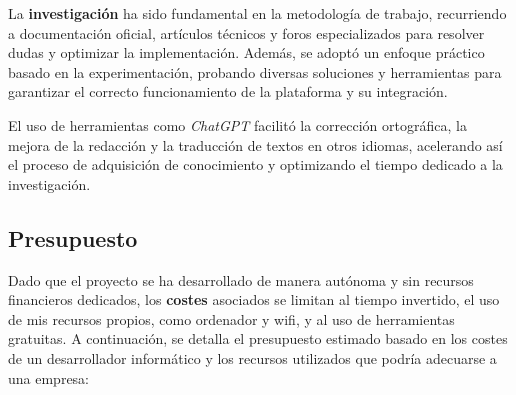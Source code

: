 La \textbf{investigación} ha sido fundamental en la metodología de trabajo, recurriendo a documentación oficial, artículos técnicos y foros especializados para resolver dudas y optimizar la implementación. Además, se adoptó un enfoque práctico basado en la experimentación, probando diversas soluciones y herramientas para garantizar el correcto funcionamiento de la plataforma y su integración.

El uso de herramientas como \textit{ChatGPT} facilitó la corrección ortográfica, la mejora de la redacción y la traducción de textos en otros idiomas, acelerando así el proceso de adquisición de conocimiento y optimizando el tiempo dedicado a la investigación.

\subsection{Presupuesto}

Dado que el proyecto se ha desarrollado de manera autónoma y sin recursos financieros dedicados, los \textbf{costes} asociados se limitan al tiempo invertido, el uso de mis recursos propios, como ordenador y wifi, y al uso de herramientas gratuitas. A continuación, se detalla el presupuesto estimado basado en los costes de un desarrollador informático y los recursos utilizados que podría adecuarse a una empresa:

